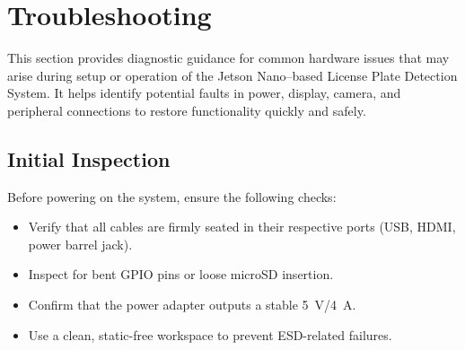 %
%
%



\chapter{Troubleshooting}

This section provides diagnostic guidance for common hardware issues that may arise during setup or operation of the Jetson Nano–based License Plate Detection System.  
It helps identify potential faults in power, display, camera, and peripheral connections to restore functionality quickly and safely.

\section{Initial Inspection}

Before powering on the system, ensure the following checks:
\begin{itemize}
	\item Verify that all cables are firmly seated in their respective ports (USB, HDMI, power barrel jack).
	\item Inspect for bent GPIO pins or loose microSD insertion.
	\item Confirm that the power adapter outputs a stable \SI{5}{\volt}/\SI{4}{\ampere}.
	\item Use a clean, static-free workspace to prevent ESD-related failures.
\end{itemize}

